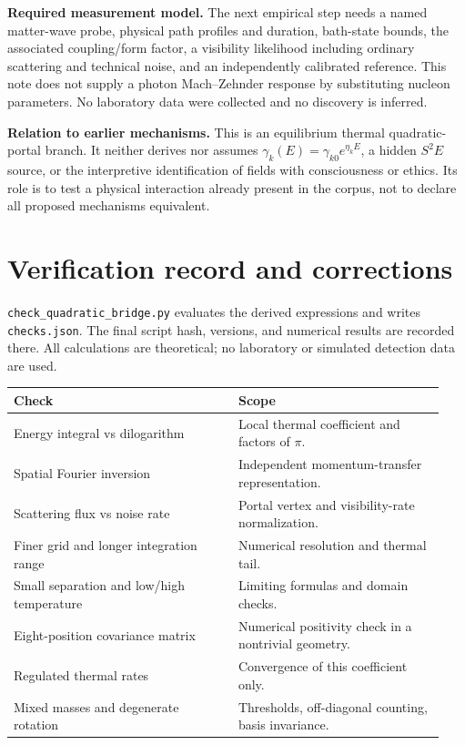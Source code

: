 \documentclass[11pt]{article}
\begin{document}
\textbf{Required measurement model.} The next empirical step needs a named
matter-wave probe, physical path profiles and duration, bath-state bounds,
the associated coupling/form factor, a visibility likelihood including
ordinary scattering and technical noise, and an independently calibrated
reference. This note does not supply a photon Mach--Zehnder response by
substituting nucleon parameters. No laboratory data were collected and no
discovery is inferred.

\textbf{Relation to earlier mechanisms.} This is an equilibrium thermal
quadratic-portal branch. It neither derives nor assumes
$\gamma_k(E)=\gamma_{k0}e^{\eta_k E}$, a hidden $S^2E$ source, or the
interpretive identification of fields with consciousness or ethics.
Its role is to test a physical interaction already present in the corpus,
not to declare all proposed mechanisms equivalent.

\newpage
\section{Verification record and corrections}
\texttt{check\_quadratic\_bridge.py} evaluates the derived expressions and
writes \texttt{checks.json}. The final script hash, versions, and numerical
results are recorded there. All calculations are theoretical; no laboratory
or simulated detection data are used.

\begin{tabular}{@{}p{0.49\linewidth}p{0.45\linewidth}@{}}
\toprule
Check & Scope \\
\midrule
Energy integral vs dilogarithm & Local thermal coefficient and factors of $\pi$.\\
Spatial Fourier inversion & Independent momentum-transfer representation.\\
Scattering flux vs noise rate & Portal vertex and visibility-rate normalization.\\
Finer grid and longer integration range & Numerical resolution and thermal tail.\\
Small separation and low/high temperature & Limiting formulas and domain checks.\\
Eight-position covariance matrix & Numerical positivity check in a nontrivial geometry.\\
Regulated thermal rates & Convergence of this coefficient only.\\
Mixed masses and degenerate rotation & Thresholds, off-diagonal counting, basis invariance.\\
\bottomrule
\end{tabular}
\end{document}
